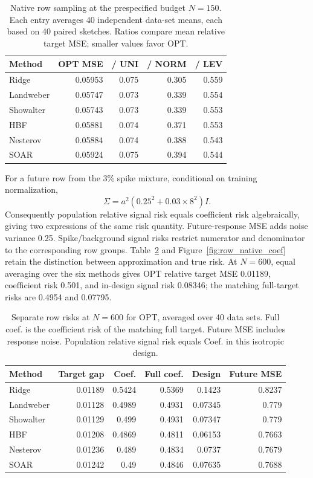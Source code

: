 \documentclass[11pt,a4paper,leqno]{article}
\numberwithin{equation}{section}
\numberwithin{figure}{section}
\numberwithin{table}{section}
\theoremstyle{plain}
\theoremstyle{definition}
\theoremstyle{remark}
\begin{document}
\begin{table}[!htbp]
\centering\small
\caption{Native row sampling at the prespecified budget $N=150$. Each entry averages 40 independent data-set means, each based on 40 paired sketches. Ratios compare mean relative target MSE; smaller values favor OPT.}
\label{tab:row_native_primary}
\begin{tabular}{lrrrr}\toprule
Method & OPT MSE & / UNI & / NORM & / LEV \\\midrule
Ridge & 0.05953 & 0.075 & 0.305 & 0.559 \\
Landweber & 0.05747 & 0.073 & 0.339 & 0.554 \\
Showalter & 0.05743 & 0.073 & 0.339 & 0.553 \\
HBF & 0.05881 & 0.074 & 0.371 & 0.553 \\
Nesterov & 0.05884 & 0.074 & 0.388 & 0.543 \\
SOAR & 0.05924 & 0.075 & 0.394 & 0.544 \\
\bottomrule\end{tabular}
\end{table}

For a future row from the 3\% spike mixture, conditional on training
normalization,
\[
 \Sigma=a^2(0.25^2+0.03\times8^2)I.
\]
Consequently population relative signal risk equals coefficient risk
algebraically, giving two expressions of the same risk quantity.
Future-response MSE adds noise variance 0.25. Spike/background signal
risks restrict numerator and denominator to the corresponding row groups.
Table~\ref{tab:row_native_risks} and Figure~\ref{fig:row_native_coef}
retain the distinction between approximation and true risk.
At $N=600$, equal averaging over the six methods gives OPT relative
target MSE 0.01189, coefficient risk 0.501, and in-design signal risk
0.08346; the matching full-target risks are 0.4954 and 0.07795.

\begin{table}[!htbp]
\centering\small
\caption{Separate row risks at $N=600$ for OPT, averaged over 40 data sets. Full coef. is the coefficient risk of the matching full target. Future MSE includes response noise. Population relative signal risk equals Coef. in this isotropic design.}
\label{tab:row_native_risks}
\begin{tabular}{lrrrrr}\toprule
Method & Target gap & Coef. & Full coef. & Design & Future MSE \\\midrule
Ridge & 0.01189 & 0.5424 & 0.5369 & 0.1423 & 0.8237 \\
Landweber & 0.01128 & 0.4989 & 0.4931 & 0.07345 & 0.779 \\
Showalter & 0.01129 & 0.499 & 0.4931 & 0.07347 & 0.779 \\
HBF & 0.01208 & 0.4869 & 0.4811 & 0.06153 & 0.7663 \\
Nesterov & 0.01236 & 0.489 & 0.4834 & 0.0737 & 0.7679 \\
SOAR & 0.01242 & 0.49 & 0.4846 & 0.07635 & 0.7688 \\
\bottomrule\end{tabular}
\end{table}
\end{document}

